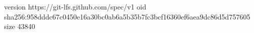 version https://git-lfs.github.com/spec/v1
oid sha256:958dddc67c0450e16a30bc0ab6a5b35b7fc3bcf16360ef6aea9dc86d5d757605
size 43840
